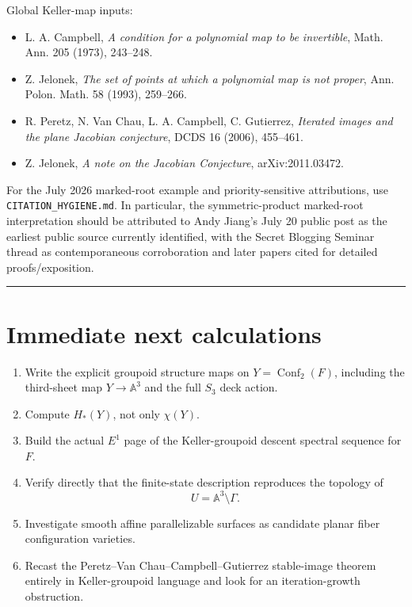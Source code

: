 Global Keller-map inputs:

\begin{itemize}
\tightlist
\item
  L. A. Campbell, \emph{A condition for a polynomial map to be
  invertible}, Math. Ann. 205 (1973), 243--248.
\item
  Z. Jelonek, \emph{The set of points at which a polynomial map is not
  proper}, Ann. Polon. Math. 58 (1993), 259--266.
\item
  R. Peretz, N. Van Chau, L. A. Campbell, C. Gutierrez, \emph{Iterated
  images and the plane Jacobian conjecture}, DCDS 16 (2006), 455--461.
\item
  Z. Jelonek, \emph{A note on the Jacobian Conjecture},
  arXiv:2011.03472.
\end{itemize}

For the July 2026 marked-root example and priority-sensitive
attributions, use \texttt{CITATION\_HYGIENE.md}. In particular, the
symmetric-product marked-root interpretation should be attributed to
Andy Jiang's July 20 public post as the earliest public source currently
identified, with the Secret Blogging Seminar thread as contemporaneous
corroboration and later papers cited for detailed proofs/exposition.

\begin{center}\rule{0.5\linewidth}{0.5pt}\end{center}

\section{Immediate next calculations}\label{immediate-next-calculations}

\begin{enumerate}
\def\labelenumi{\arabic{enumi}.}
\tightlist
\item
  Write the explicit groupoid structure maps on
  \(Y=\operatorname{Conf}_2(F)\), including the third-sheet map
  \(Y\to\mathbb A^3\) and the full \(S_3\) deck action.
\item
  Compute \(H_*(Y)\), not only \(\chi(Y)\).
\item
  Build the actual \(E^1\) page of the Keller-groupoid descent spectral
  sequence for \(F\).
\item
  Verify directly that the finite-state description reproduces the
  topology of \[
  U=\mathbb A^3\setminus\Gamma.
  \]
\item
  Investigate smooth affine parallelizable surfaces as candidate planar
  fiber configuration varieties.
\item
  Recast the Peretz--Van Chau--Campbell--Gutierrez stable-image theorem
  entirely in Keller-groupoid language and look for an iteration-growth
  obstruction.
\end{enumerate}

